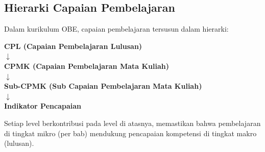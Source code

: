 \subsection{Hierarki Capaian Pembelajaran}

\begin{konsep}
Dalam kurikulum OBE, capaian pembelajaran tersusun dalam hierarki:

\textbf{CPL (Capaian Pembelajaran Lulusan)} \\
$\downarrow$ \\
\textbf{CPMK (Capaian Pembelajaran Mata Kuliah)} \\
$\downarrow$ \\
\textbf{Sub-CPMK (Sub Capaian Pembelajaran Mata Kuliah)} \\
$\downarrow$ \\
\textbf{Indikator Pencapaian}

Setiap level berkontribusi pada level di atasnya, memastikan bahwa pembelajaran di tingkat mikro (per bab) mendukung pencapaian kompetensi di tingkat makro (lulusan).
\end{konsep}
